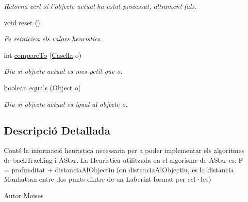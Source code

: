 \begin{DoxyCompactItemize}
\begin{DoxyCompactList}\small\item\em Retorna cert si l'objecte actual ha estat processat, altrament fals. \end{DoxyCompactList}\item 
void \hyperlink{classlogica_1_1algoritmica_1_1_casella_a8ed287353991f4b700bc45145dc00ab7}{reset} ()
\begin{DoxyCompactList}\small\item\em Es reinicien els valors heuristics. \end{DoxyCompactList}\item 
int \hyperlink{classlogica_1_1algoritmica_1_1_casella_aae2b9f535fd0da3a750f6a6048db1944}{compare\+To} (\hyperlink{classlogica_1_1algoritmica_1_1_casella}{Casella} o)
\begin{DoxyCompactList}\small\item\em Diu si objecte actual es mes petit que o. \end{DoxyCompactList}\item 
boolean \hyperlink{classlogica_1_1algoritmica_1_1_casella_ab47747886e465a9fdda726b0cdb987da}{equals} (Object o)
\begin{DoxyCompactList}\small\item\em Diu si objecte actual es igual al objecte o. \end{DoxyCompactList}\end{DoxyCompactItemize}


\subsection{Descripció Detallada}
Conté la informació heuristica necessaria per a poder implementar els algoritmes de back\+Tracking i A\+Star. La Heuristica utilitzada en el algorisme de A\+Star es\+: F = profunditat + distancia\+Al\+Objectiu (on distancia\+Al\+Objectiu, es la distancia Manhattan entre dos punts dintre de un Laberint format per cel·les) 

\begin{DoxyAuthor}{Autor}
Moises 
\end{DoxyAuthor}


